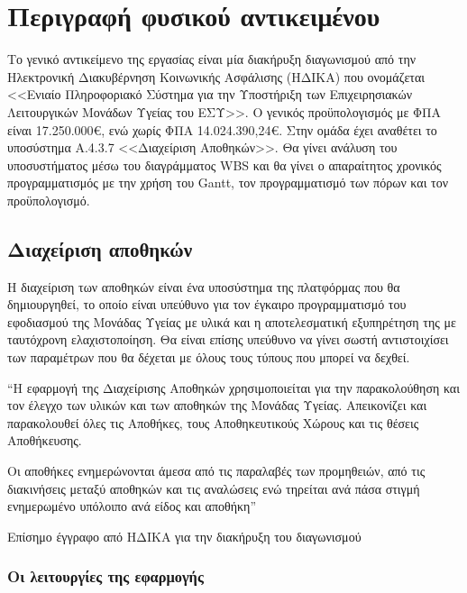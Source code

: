 \label{Chapter2}

\section{Περιγραφή φυσικού αντικειμένου}

Το γενικό αντικείμενο της εργασίας είναι μία διακήρυξη διαγωνισμού από την Ηλεκτρονική Διακυβέρνηση Κοινωνικής Ασφάλισης (ΗΔΙΚΑ) που ονομάζεται <<Ενιαίο Πληροφοριακό Σύστημα για την Υποστήριξη των Επιχειρησιακών Λειτουργικών Μονάδων Υγείας του ΕΣΥ>>. Ο γενικός προϋπολογισμός με ΦΠΑ είναι 17.250.000\euro, ενώ χωρίς ΦΠΑ 14.024.390,24\euro. Στην ομάδα έχει αναθέτει το υποσύστημα Α.4.3.7 <<Διαχείριση Αποθηκών>>. Θα γίνει ανάλυση του υποσυστήματος μέσω του διαγράμματος WBS και θα γίνει ο απαραίτητος χρονικός προγραμματισμός με την χρήση του Gantt, τον προγραμματισμό των πόρων και τον προϋπολογισμό.

\subsection{Διαχείριση αποθηκών}

Η διαχείριση των αποθηκών είναι ένα υποσύστημα της πλατφόρμας που θα δημιουργηθεί, το οποίο είναι υπεύθυνο για τον έγκαιρο προγραμματισμό του εφοδιασμού της Μονάδας Υγείας με υλικά και η αποτελεσματική εξυπηρέτηση της με ταυτόχρονη ελαχιστοποίηση. Θα είναι επίσης υπεύθυνο να γίνει σωστή αντιστοιχίσει των παραμέτρων που θα δέχεται με όλους τους τύπους που μπορεί να δεχθεί.

\begin{problem}
  ``Η εφαρμογή της Διαχείρισης Αποθηκών χρησιμοποιείται για την παρακολούθηση και τον έλεγχο των
  υλικών και των αποθηκών της Μονάδας Υγείας. Απεικονίζει και παρακολουθεί όλες τις Αποθήκες, τους
  Αποθηκευτικούς Χώρους και τις θέσεις Αποθήκευσης. \par

  Οι αποθήκες ενημερώνονται άμεσα από τις παραλαβές των προμηθειών, από τις διακινήσεις μεταξύ
  αποθηκών και τις αναλώσεις ενώ τηρείται ανά πάσα στιγμή ενημερωμένο υπόλοιπο ανά είδος και
  αποθήκη''

  Επίσημο έγγραφο από ΗΔΙΚΑ για την διακήρυξη του διαγωνισμού
\end{problem}

\subsubsection{Οι λειτουργίες της εφαρμογής}
\label{chap:workflow}


